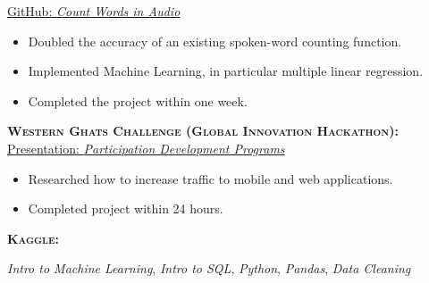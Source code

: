 \documentclass[12pt]{resume}
\newcommand{\mySpace}{.4in}
\newcommand{\myLeft}{\hspace*{-\mySpace}}
\newcommand{\MBGray}[1]{\textcolor{black!60}{#1}}
\newcommand{\myDateGray}[1]{\MBGray{#1}}
\newcommand{\myMonth}[1]{\ifthenelse{\boolean{Month}}{#1}{}}
\newcommand{\SkipEmpty}[2]{\ifthenelse{\equal{#1}{}}{#1}{#2}}
\newcommand{\MYDMYP}[6]{\marginpar{\fontfamily{cmr}\selectfont\hbox{\myDateGray{\myDS%
\SkipEmpty{#1}{\myMonth{\resizebox{\widthof{Apr}}{\height}{#1}} }%
\SkipEmpty{#2}{\resizebox{\widthof{2022}}{\height}{#2}}%
\SkipEmpty{#3}{ - }%
\SkipEmpty{#4}{\myMonth{\resizebox{\widthof{Apr}}{\height}{#4}} }%
\SkipEmpty{#5}{\resizebox{\widthof{2020}}{\height}{#5}}%
\SkipEmpty{#6}{{Present}}%
}}}}
\newcommand{\mySubsection}[1]{\myLeft\textsc{\textbf{#1}}}
\newcommand{\myrulefill}{\vspace*{-.15in}\myLeft\myLeft\hrulefill}
\newcommand{\maybeskipt}{ }
\newcommand{\SubSecSkip}{\smallskip}
\newcommand{\mySection}[1]{\myLeft\myLeft\uppercase{\textbf{#1}}

\myrulefill

\maybeskipt}
\newcommand{\mySep}{\vfill}
\begin{document}
{{\href{https://github.com/JonathanDoanePhD/Count_Words_in_Audio}{%
GitHub: \textsl{Count Words in Audio}}

\begin{itemize}
\item Doubled the accuracy of an existing spoken-word counting function.
\item Implemented Machine Learning, in particular multiple linear regression.
\item Completed the project within one week.
\end{itemize}



\vspace*{.05in}
\mySubsection{Western Ghats Challenge (Global Innovation Hackathon):}
\href{https://sites.google.com/view/doanemath/recent-work}{%
Presentation:  \textsl{Participation Development Programs}}

\begin{itemize}
\item
Researched how to increase traffic to mobile and web applications.

\item
Completed project within 24 hours.
\end{itemize}



\vspace*{.05in}
\mySubsection{Kaggle:} 

\textit{Intro to Machine Learning},
\textit{Intro to SQL}, 
\textit{Python}, 
\textit{Pandas}, 
\textit{Data Cleaning}}





\mySep





%
%
%
%
%
%
%
%
%





}
\end{document}
